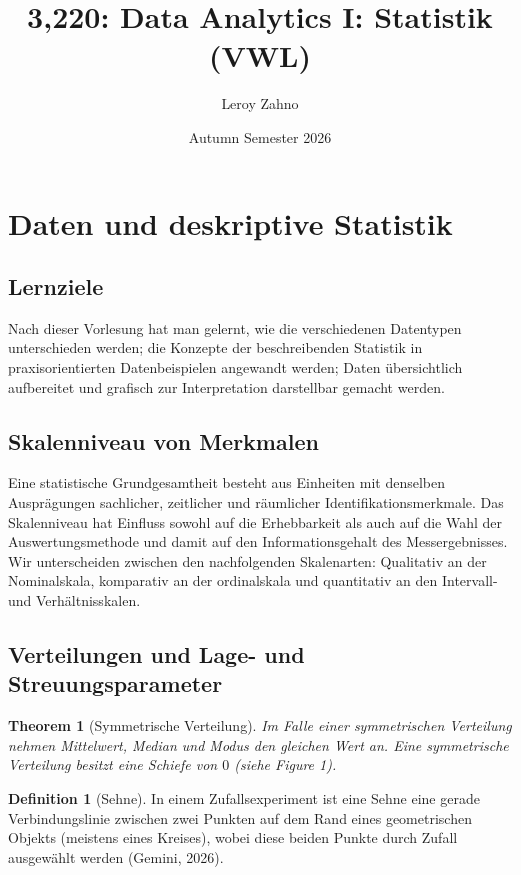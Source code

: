 \documentclass{article}
\title{3,220: Data Analytics I: Statistik (VWL)}
\author{Leroy Zahno}
\date{Autumn Semester 2026}
\makeatletter
\renewcommand{\maketitle}{%
  \begin{center}
    {\LARGE \@title \par}
    \vspace{1em}
    {\large \@author \par}
    \vspace{1em}
    {\large \@date \par}
  \end{center}
}
\newtheorem{theorem}{Theorem}
\theoremstyle{definition}
\newtheorem{definition}{Definition}
\theoremstyle{exercise}
\theoremstyle{solution}
\theoremstyle{lemma}
\makeatother
\begin{document}
\maketitle
\tableofcontents

\section{Daten und deskriptive Statistik}
\subsection{Lernziele}
Nach dieser Vorlesung hat man gelernt, wie die verschiedenen Datentypen unterschieden werden; die Konzepte der beschreibenden Statistik in praxisorientierten Datenbeispielen angewandt werden; Daten übersichtlich aufbereitet und grafisch zur Interpretation darstellbar gemacht werden. 

\subsection{Skalenniveau von Merkmalen}
Eine statistische Grundgesamtheit besteht aus Einheiten mit denselben Ausprägungen sachlicher, zeitlicher und räumlicher Identifikationsmerkmale. Das Skalenniveau hat Einfluss sowohl auf die Erhebbarkeit als auch auf die Wahl der Auswertungsmethode und damit auf den Informationsgehalt des Messergebnisses. Wir unterscheiden zwischen den nachfolgenden Skalenarten: Qualitativ an der Nominalskala, komparativ an der ordinalskala und quantitativ an den Intervall- und Verhältnisskalen.

\subsection{Verteilungen und Lage- und Streuungsparameter}
\begin{theorem}[Symmetrische Verteilung]
Im Falle einer \textit{symmetrischen Verteilung} nehmen Mittelwert, Median und Modus den gleichen Wert an. Eine symmetrische Verteilung besitzt eine Schiefe von $0$ (siehe Figure 1). 
\end{theorem}

\begin{definition}[Sehne]
In einem Zufallsexperiment ist eine Sehne eine gerade Verbindungslinie zwischen zwei Punkten auf dem Rand eines geometrischen Objekts (meistens eines Kreises), wobei diese beiden Punkte durch Zufall ausgewählt werden (Gemini, 2026).
\end{definition}
\end{document}
